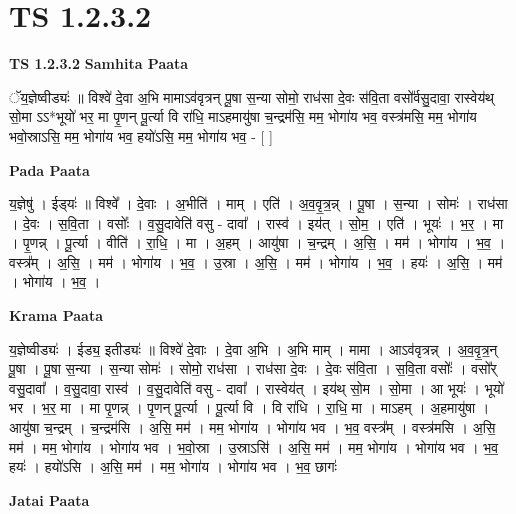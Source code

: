 \documentclass[17pt]{extarticle}
\begin{document}
\section{ TS 1.2.3.2 }

\textbf{TS 1.2.3.2 } \newline
\textbf{Samhita Paata} \newline

ॅय॒ज्ञेष्वीड्यः॑ ॥ विश्वे॑ दे॒वा अ॒भि मामाऽव॑वृत्रन् पू॒षा स॒न्या सोमो॒ राध॑सा दे॒वः स॑वि॒ता वसो᳚र्वसु॒दावा॒ रास्वेय॑थ् सो॒मा ऽऽ*भूयो॑ भर॒ मा पृ॒णन् पू॒र्त्या वि रा॑धि॒ माऽहमायु॑षा च॒न्द्रम॑सि॒ मम॒ भोगा॑य भव॒ वस्त्र॑मसि॒ मम॒ भोगा॑य भवो॒स्राऽसि॒ मम॒ भोगा॑य भव॒ हयो॑ऽसि॒ मम॒ भोगा॑य भव॒ - [ ] \newline

\textbf{Pada Paata} \newline

य॒ज्ञेषु॑ । ईड्‍यः॑ ॥ विश्वे᳚ । दे॒वाः । अ॒भीति॑ । माम् । एति॑ । अ॒व॒वृ॒त्र॒न्न् । पू॒षा । स॒न्या । सोमः॑ । राध॑सा । दे॒वः । स॒वि॒ता । वसोः᳚ । व॒सु॒दावेति॑ वसु - दावा᳚ । रास्व॑ । इय॑त् । सो॒म॒ । एति॑ । भूयः॑ । भ॒र॒ । मा । पृ॒णन्न् । पू॒र्त्या । वीति॑ । रा॒धि॒ । मा । अ॒हम् । आयु॑षा । च॒न्द्रम् । अ॒सि॒ । मम॑ । भोगा॑य । भ॒व॒ । वस्त्र᳚म् । अ॒सि॒ । मम॑ । भोगा॑य । भ॒व॒ । उ॒स्रा । अ॒सि॒ । मम॑ । भोगा॑य । भ॒व॒ । हयः॑ । अ॒सि॒ । मम॑ । भोगा॑य । भ॒व॒ ।  \newline


\textbf{Krama Paata} \newline

य॒ज्ञेष्वीड्यः॑ । ईड्य॒ इतीड्यः॑ ॥ विश्वे॑ दे॒वाः । दे॒वा अ॒भि । अ॒भि माम् । मामा । आऽव॑वृत्रन्न् । अ॒व॒वृ॒त्र॒न् पू॒षा । पू॒षा स॒न्या । स॒न्या सोमः॑ । सोमो॒ राध॑सा । राध॑सा दे॒वः । दे॒वः स॑वि॒ता । स॒वि॒ता वसोः᳚ । वसो᳚र् वसु॒दावा᳚ । व॒सु॒दावा॒ रास्व॑ । व॒सु॒दावेति॑ वसु - दावा᳚ । रास्वेय॑त् । इय॑थ् सो॒म । सो॒मा । आ भूयः॑ । भूयो॑ भर । भ॒र॒ मा । मा पृ॒णन्न् । पृ॒णन् पू॒र्त्या । पू॒र्त्या वि । वि रा॑धि । रा॒धि॒ मा । माऽहम् । अ॒हमायु॑षा । आयु॑षा च॒न्द्रम् । च॒न्द्रम॑सि । अ॒सि॒ मम॑ । मम॒ भोगा॑य । भोगा॑य भव । भ॒व॒ वस्त्र᳚म् । वस्त्र॑मसि । अ॒सि॒ मम॑ । मम॒ भोगा॑य । भोगा॑य भव । भ॒वो॒स्रा । उ॒स्राऽसि॑ । अ॒सि॒ मम॑ । मम॒ भोगा॑य । भोगा॑य भव । भ॒व॒ हयः॑ । हयो॑ऽसि । अ॒सि॒ मम॑ । मम॒ भोगा॑य । भोगा॑य भव । भ॒व॒ छागः॑ \newline

\textbf{Jatai Paata} \newline
\end{document}
